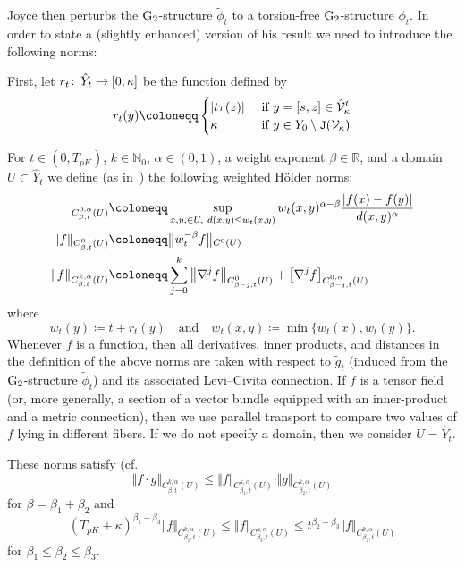 \documentclass[11pt,a4paper]{scrartcl}
\newcommand{\col}{\colon \thinspace}
\newcommand{\VertC}[2]{\Vert_{C^{{#1}}{#2}}}
\newcommand{\VertWCt}[3]{\Vert_{C^{{#1}}_{{#2},t}{#3}}}
\newcommand{\VertWHt}[3]{\Vert_{C^{{#1},\alpha}_{{#2},t}{#3}}}
\newcommand{\WsHt}[3]{]_{C^{{#1},\alpha}_{{#2},t}{#3}}}
\newcommand{\G}{\textup{G}}
\numberwithin{equation}{section}
\theoremstyle{plain}
\theoremstyle{definition}
\theoremstyle{remark}
\begin{document}
Joyce then perturbs the $\G_2$-structure $\tilde{\phi}_t$ to a torsion-free $\G_2$-structure $\phi_t$. In order to state a (slightly enhanced) version of his result we need to introduce the following norms:

First, let $r_t \col \hat{Y}_t \to [0,\kappa]$ be the function defined by 
\begin{align*}
r_t(y) \coloneqq 
\begin{cases}
\vert t \tau(z) \vert &\textup{ if $y=[s,z] \in \hat{\mathcal{V}}_{\kappa}^t$} \\
\kappa & \textup{ if $y \in Y_0 \setminus \mathtt{J}(\mathcal{V}_{\kappa})$}
\end{cases}
\end{align*}

For $t \in (0,T_{pK})$, $k\in \mathbb{N}_0$, $\alpha \in (0,1)$, a weight exponent $\beta \in \mathbb{R}$, and a domain $U \subset \hat{Y}_t$ we define (as in~\cite[Section~6]{Walpuski-InstantonsKummer}) the following weighted Hölder norms:
\begin{align*}
[f\WsHt{0}{\beta}{(U)} &\coloneqq \sup_{x,y,\in U,\ d(x,y)\leq w_t(x,y)} w_t(x,y)^{\alpha-\beta} \frac{\vert f(x)-f(y) \vert}{d(x,y)^\alpha}  \\
\Vert f \VertWCt{0}{\beta}{(U)} & \coloneqq \big\Vert w_t^{-\beta} f \big{\VertC{0}{(U)}} \\
\Vert f \VertWHt{k}{\beta}{(U)} & \coloneqq \sum_{j=0}^k \left\Vert \nabla^j f \right\VertWCt{0}{\beta-j}{(U)} + \left[\nabla^j f\right\WsHt{0}{\beta-j}{(U)}
\end{align*}
where \[w_t(y) \coloneqq t + r_t(y) \quad \text{and} \quad w_t(x,y)\coloneqq \min\{w_t(x),w_t(y)\}.\] Whenever $f$ is a function, then all derivatives, inner products, and distances in the definition of the above norms are taken with respect to $\tilde{g}_t$ (induced from the $\G_2$-structure $\tilde{\phi}_t$) and its associated Levi--Civita connection. If $f$ is a tensor field (or, more generally, a section of a vector bundle equipped with an inner-product and a metric connection), then we use parallel transport to compare two values of $f$ lying in different fibers. If we do not specify a domain, then we consider $U= \hat{Y}_t$.

These norms satisfy (cf.~\cite[Equation~(6.5) and~(6.6)]{Walpuski-InstantonsKummer}
\begin{equation}\label{eq:weighted-t-Höldernorms-multiplication}
\Vert f\cdot g\VertWHt{k}{\beta}{(U)} \leq \Vert f\VertWHt{k}{\beta_1}{(U)}\cdot \Vert g\VertWHt{k}{\beta_2}{(U)} 
\end{equation}  
for $\beta=\beta_1+\beta_2$ and 
\begin{equation}\label{eq:weighted-t-Höldernorms-estimates}
(T_{pK}+\kappa)^{\beta_1-\beta_3} \Vert f \VertWHt{k}{\beta_1}{(U)} \leq \Vert f \VertWHt{k}{\beta_3}{(U)} \leq t^{\beta_2-\beta_3} \Vert f \VertWHt{k}{\beta_2}{(U)} 
\end{equation} 
for $\beta_1 \leq \beta_2\leq \beta_3$.
\end{document}
